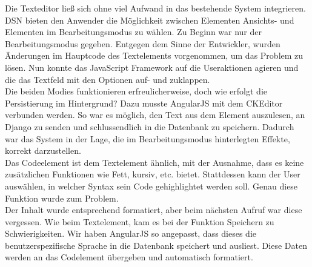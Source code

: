 Die Texteditor ließ sich ohne viel Aufwand in das bestehende System integrieren. DSN bieten den Anwender die Möglichkeit zwischen Elementen Ansichts- und Elementen im Bearbeitungsmodus zu wählen. Zu Beginn war nur der Bearbeitungsmodus gegeben. Entgegen dem Sinne der Entwickler, wurden Änderungen im Hauptcode des Textelements vorgenommen, um das Problem zu lösen. Nun konnte das JavaScript Framework auf die Useraktionen agieren und die das Textfeld mit den Optionen auf- und zuklappen.\\
Die beiden Modies funktionieren erfreulicherweise, doch wie erfolgt die Persistierung im Hintergrund? Dazu musste AngularJS mit dem CKEditor verbunden werden. So war es möglich, den Text aus dem Element auszulesen, an Django zu senden und schlussendlich in die Datenbank zu speichern. Dadurch war das System in der Lage, die im Bearbeitungsmodus hinterlegten Effekte, korrekt darzustellen.\\

Das Codeelement ist dem Textelement ähnlich, mit der Ausnahme, dass es keine zusätzlichen Funktionen wie Fett, kursiv, etc. bietet. Stattdessen kann der User auswählen, in welcher Syntax sein Code gehighlightet werden soll. Genau diese Funktion wurde zum Problem.\\
Der Inhalt wurde entsprechend formatiert, aber beim nächsten Aufruf war diese vergessen. Wie beim Textelement, kam es bei der Funktion Speichern zu Schwierigkeiten. Wir haben AngularJS so angepasst, dass dieses die benutzerspezifische Sprache in die Datenbank speichert und ausliest. Diese Daten werden an das Codelement übergeben und automatisch formatiert.
